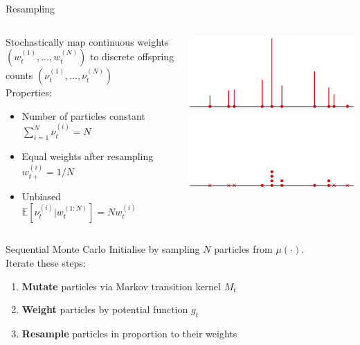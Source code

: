 \documentclass[aspectratio=169]{beamer}
\theoremstyle{definition}
\newcommand{\E}{\mathbb{E}}
\newcommand{\vt}[2][t]{\nu_{#1}^{(#2)}}
\newcommand{\wt}[2][t]{w_{#1}^{(#2)}}
\begin{document}
\begin{frame}{Resampling}
\begin{columns}
\begin{column}{0.45\textwidth}
Stochastically map continuous weights $(\wt{1}, \dots, \wt{N})$ to discrete offspring counts $(\vt{1},\dots, \vt{N})$\\[10pt]
Properties:
\begin{itemize}
\item Number of particles constant $\sum_{i=1}^N \vt{i} =N$
\item Equal weights after resampling $w_{t+}^{(i)} = 1/N$
\item Unbiased\\ $\E[\vt{i} | \wt{1:N}] = N\wt{i}$
\end{itemize}

\end{column}
\begin{column}{0.45\textwidth}
\centering
{}
\includegraphics[width=\textwidth]{resample1.pdf} \\
\includegraphics[width=\textwidth]{resample2.pdf}
\end{column}
\end{columns}
\end{frame}


\begin{frame}{Sequential Monte Carlo}
Initialise by sampling $N$ particles from $\mu(\cdot)$.\\[10pt]
Iterate these steps:
\begin{enumerate}
\item \textbf{Mutate} particles via Markov transition kernel $M_t$
\item \textbf{Weight} particles by potential function $g_t$
\item \textbf{Resample} particles in proportion to their weights
\end{enumerate}
\end{frame}
\end{document}
